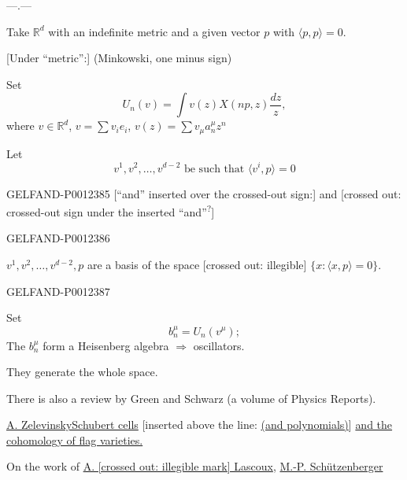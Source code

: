 \begin{center}—\quad .\quad —\end{center}

Take $\mathbb R^d$ with an indefinite metric and a given vector $p$ with $\langle p,p\rangle=0$.

[Under “metric”:] (Minkowski, one minus sign)

Set
\begin{equation*}
U_n(v)=\int v(z)X(np,z)\frac{dz}{z},
\tag{14}
\end{equation*}
where $v\in\mathbb R^d$, $v=\sum v_i e_i$, $v(z)=\sum v_\mu a_n^\mu z^n$

Let
\begin{equation*}
v^1,v^2,\ldots,v^{d-2}\text{ be such that }\langle v^i,p\rangle=0
\tag{15}
\end{equation*}
\begin{GelfandAdjacentEvidence}{GELFAND-P001238}{5}
[“and” inserted over the crossed-out sign:] and [crossed out: crossed-out sign under the inserted “and”\textsuperscript{?}]
\end{GelfandAdjacentEvidence}
\begin{GelfandAdjacentEvidence}{GELFAND-P001238}{6}

$v^1,v^2,\ldots,v^{d-2},p$ are a basis of the space
[crossed out: illegible] $\{x:\langle x,p\rangle=0\}$.
\end{GelfandAdjacentEvidence}
\begin{GelfandAdjacentEvidence}{GELFAND-P001238}{7}


Set
\begin{equation*}
b_n^\mu=U_n(v^\mu);
\tag{16}
\end{equation*}
The $b_n^\mu$ form a Heisenberg algebra $\Rightarrow$ oscillators.

They generate the whole space.

There is also a review by Green and Schwarz (a volume of Physics Reports).

\bigskip
\underline{A. Zelevinsky}\qquad \underline{Schubert cells}
[inserted above the line: \underline{(and polynomials)}]
\underline{and the cohomology of flag varieties.}

On the work of \underline{A. [crossed out: illegible mark] Lascoux}, \underline{M.-P. Schützenberger}
\end{GelfandAdjacentEvidence}
